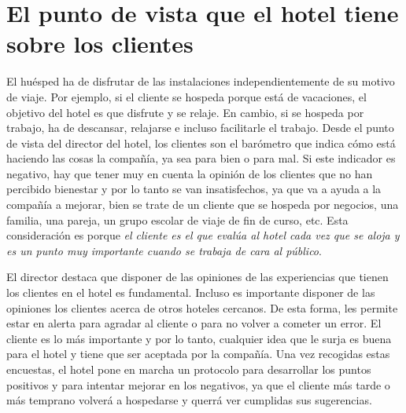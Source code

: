 \section*{El punto de vista que el hotel tiene sobre los clientes}

El huésped ha de disfrutar de las instalaciones independientemente de su motivo de viaje. Por ejemplo, si el cliente se hospeda porque está de vacaciones, el objetivo del hotel es que disfrute y se relaje. En cambio, si se hospeda por trabajo, ha de descansar, relajarse e incluso facilitarle el trabajo. Desde el punto de vista del director del hotel, los clientes son el barómetro que indica cómo está haciendo las cosas la compañía, ya sea para bien o para mal. Si este indicador es negativo, hay que tener muy en cuenta la opinión de los clientes que no han percibido bienestar y por lo tanto se van insatisfechos, ya que va a ayuda a la compañía a mejorar, bien se trate de un cliente que se hospeda por negocios, una familia, una pareja, un grupo escolar de viaje de fin de curso, etc. Esta consideración es porque \emph{el cliente es el que evalúa al hotel cada vez que se aloja y es un punto muy importante cuando se trabaja de cara al público}.

El director destaca que disponer de las opiniones de las experiencias que tienen los clientes en el hotel es fundamental. Incluso es importante disponer de las opiniones los clientes acerca de otros hoteles cercanos. De esta forma, les permite estar en alerta para agradar al cliente o para no volver a cometer un error. El cliente es lo más importante y por lo tanto, cualquier idea que le surja es buena para el hotel y tiene que ser aceptada por la compañía. Una vez recogidas estas encuestas, el hotel pone en marcha un protocolo para desarrollar los puntos positivos y para intentar mejorar en los negativos, ya que el cliente más tarde o más temprano volverá a hospedarse y querrá ver cumplidas sus sugerencias.

